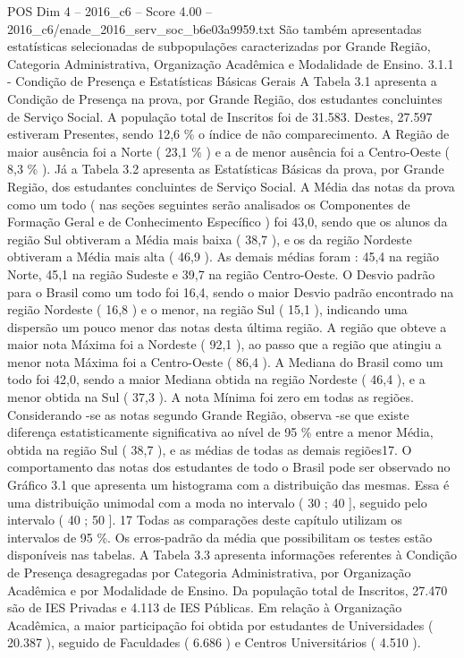 \begin{textsample}{POS Dim 4 – 2016\_c6 – Score 4.00 – 2016\_c6/enade\_2016\_serv\_soc\_b6e03a9959.txt}
São também apresentadas estatísticas selecionadas de subpopulações caracterizadas por Grande Região, Categoria Administrativa, Organização Acadêmica e Modalidade de Ensino. 3.1.1 - Condição de Presença e Estatísticas Básicas Gerais A Tabela 3.1 apresenta a Condição de Presença na prova, por Grande Região, dos estudantes concluintes de Serviço Social.
A população total de Inscritos foi de 31.583.
Destes, 27.597 estiveram Presentes, sendo 12,6 \% o índice de não comparecimento.
A Região de maior ausência foi a Norte ( 23,1 \% ) e a de menor ausência foi a Centro-Oeste ( 8,3 \% ).
Já a Tabela 3.2 apresenta as Estatísticas Básicas da prova, por Grande Região, dos estudantes concluintes de Serviço Social.
A Média das notas da prova como um todo ( nas seções seguintes serão analisados os Componentes de Formação Geral e de Conhecimento Específico ) foi 43,0, sendo que os alunos da região Sul obtiveram a Média mais baixa ( 38,7 ), e os da região Nordeste obtiveram a Média mais alta ( 46,9 ).
As demais médias foram : 45,4 na região Norte, 45,1 na região Sudeste e 39,7 na região Centro-Oeste.
O Desvio padrão para o Brasil como um todo foi 16,4, sendo o maior Desvio padrão encontrado na região Nordeste ( 16,8 ) e o menor, na região Sul ( 15,1 ), indicando uma dispersão um pouco menor das notas desta última região.
A região que obteve a maior nota Máxima foi a Nordeste ( 92,1 ), ao passo que a região que atingiu a menor nota Máxima foi a Centro-Oeste ( 86,4 ).
A Mediana do Brasil como um todo foi 42,0, sendo a maior Mediana obtida na região Nordeste ( 46,4 ), e a menor obtida na Sul ( 37,3 ).
A nota Mínima foi zero em todas as regiões.
Considerando -se as notas segundo Grande Região, observa -se que existe diferença estatisticamente significativa ao nível de 95 \% entre a menor Média, obtida na região Sul ( 38,7 ), e as médias de todas as demais regiões17.
O comportamento das notas dos estudantes de todo o Brasil pode ser observado no Gráfico 3.1 que apresenta um histograma com a distribuição das mesmas.
Essa é uma distribuição unimodal com a moda no intervalo ( 30 ; 40 ], seguido pelo intervalo ( 40 ; 50 ]. 17 Todas as comparações deste capítulo utilizam os intervalos de 95 \%.
Os erros-padrão da média que possibilitam os testes estão disponíveis nas tabelas.
A Tabela 3.3 apresenta informações referentes à Condição de Presença desagregadas por Categoria Administrativa, por Organização Acadêmica e por Modalidade de Ensino.
Da população total de Inscritos, 27.470 são de IES Privadas e 4.113 de IES Públicas.
Em relação à Organização Acadêmica, a maior participação foi obtida por estudantes de Universidades ( 20.387 ), seguido de Faculdades ( 6.686 ) e Centros Universitários ( 4.510 ).

\end{textsample}
